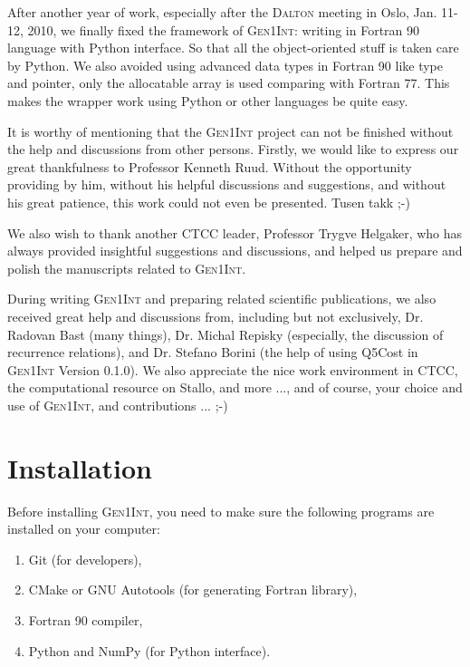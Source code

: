 \documentclass[a4paper,11pt,twoside,openright]{book}
\begin{document}
After another year of work, especially after the \textsc{Dalton} meeting in Oslo, Jan. 11-12, 2010,
we finally fixed the framework of \textsc{Gen1Int}: writing in Fortran 90 language with Python interface.
So that all the object-oriented stuff is taken care by Python. We also avoided using advanced data
types in Fortran 90 like type and pointer, only the allocatable array is used comparing with Fortran 77.
This makes the wrapper work using Python or other languages be quite easy.

It is worthy of mentioning that the \textsc{Gen1Int} project can not be finished without the help and
discussions from other persons. Firstly, we would like to express our great thankfulness to
Professor Kenneth Ruud. Without the opportunity providing by him, without his helpful discussions
and suggestions, and without his great patience, this work could not even be presented. Tusen takk ;-)

We also wish to thank another CTCC leader, Professor Trygve Helgaker, who has always provided insightful
suggestions and discussions, and helped us prepare and polish the manuscripts related to \textsc{Gen1Int}.

During writing \textsc{Gen1Int} and preparing related scientific publications, we also received great help and
discussions from, including but not exclusively, Dr. Radovan Bast (many things), Dr. Michal Repisky (especially,
the discussion of recurrence relations), and Dr. Stefano Borini (the help of using Q5Cost in \textsc{Gen1Int}
Version 0.1.0). We also appreciate the nice work environment in CTCC, the computational resource on Stallo,
and more ..., and of course, your choice and use of \textsc{Gen1Int}, and contributions ... ;-)

\mainmatter
{}

\chapter{Installation}
\label{chap:installation}

Before installing \textsc{Gen1Int}, you need to make sure the following programs are installed on your computer:
\begin{enumerate}
  \item Git (for developers),
  \item CMake or GNU Autotools (for generating Fortran library),
  \item Fortran 90 compiler,
  \item Python and NumPy (for Python interface).
\end{enumerate}
\end{document}
